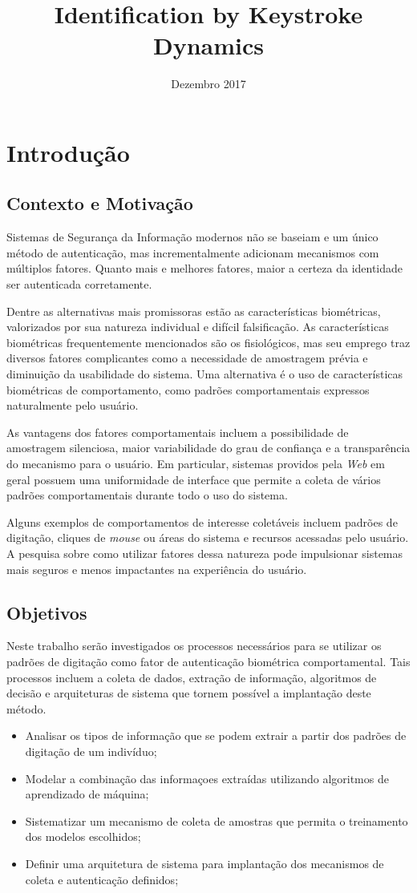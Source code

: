 \documentclass[pfc]{imetex}
\title{Identification by Keystroke Dynamics}
\date{Dezembro 2017}
\begin{document}
\chapter{Introdução}

\section{Contexto e Motivação}
Sistemas de Segurança da Informação modernos não se baseiam e um único método de autenticação, mas incrementalmente adicionam mecanismos com múltiplos fatores. Quanto mais e melhores fatores, maior a certeza da identidade ser autenticada corretamente.

Dentre as alternativas mais promissoras estão as características biométricas, valorizados por sua natureza individual e difícil falsificação. As características biométricas frequentemente mencionados são os fisiológicos, mas seu emprego traz diversos fatores complicantes como a necessidade de amostragem prévia e diminuição da usabilidade do sistema. Uma alternativa é o uso de características biométricas de comportamento, como padrões comportamentais expressos naturalmente pelo usuário.

As vantagens dos fatores comportamentais incluem a possibilidade de amostragem silenciosa, maior variabilidade do grau de confiança e a transparência do mecanismo para o usuário. Em particular, sistemas providos pela \textit{Web} em geral possuem uma uniformidade de interface que permite a coleta de vários padrões comportamentais durante todo o uso do sistema.

Alguns exemplos de comportamentos de interesse coletáveis incluem padrões de digitação, cliques de \textit{mouse} ou áreas do sistema e recursos acessadas pelo usuário. A pesquisa sobre como utilizar fatores dessa natureza pode impulsionar sistemas mais seguros e menos impactantes na experiência do usuário.

\section{Objetivos}
Neste trabalho serão investigados os processos necessários para se utilizar os padrões de digitação como fator de autenticação biométrica comportamental. Tais processos incluem a coleta de dados, extração de informação, algoritmos de decisão e arquiteturas de sistema que tornem possível a implantação deste método.

\begin{itemize}
\item Analisar os tipos de informação que se podem extrair a partir dos padrões de digitação de um indivíduo;
\item Modelar a combinação das informaçoes extraídas utilizando algoritmos de aprendizado de máquina;
\item Sistematizar um mecanismo de coleta de amostras que permita o treinamento dos modelos escolhidos;
\item Definir uma arquitetura de sistema para implantação dos mecanismos de coleta e autenticação definidos;
\end{itemize}
\end{document}
